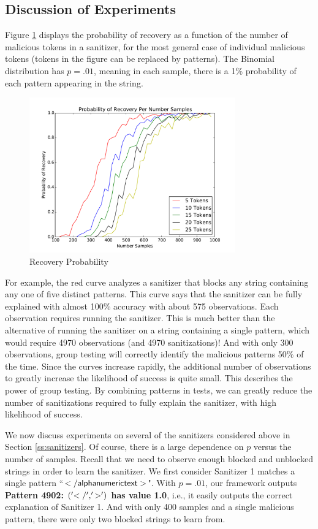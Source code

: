 \subsection{Discussion of Experiments}
Figure \ref{fig:recovery_probability} displays the probability of recovery as a function of the number of malicious tokens in a sanitizer, for the most general case of individual malicious tokens (tokens in the figure can be replaced by patterns). The Binomial distribution has $p=.01$, meaning in each sample, there is a 1\% probability of each pattern appearing in the string.
\begin{figure}[!thb]
	\centering
	\includegraphics[width=3.5in]{./recovery_probability_per_samples.pdf}
	\caption{Recovery Probability}
	\label{fig:recovery_probability}
\end{figure}
For example, the red curve analyzes a sanitizer that blocks any string containing any one of five distinct patterns. This curve says that the sanitizer can be fully explained with almost 100\% accuracy with about 575 observations. Each observation requires running the sanitizer. This is much better than the alternative of running the sanitizer on a string containing a single pattern, which would require 4970 observations (and 4970 sanitizations)! And with only 300 observations, group testing will correctly identify the malicious patterns 50\% of the time. Since the curves increase rapidly, the additional number of observations to greatly increase the likelihood of success is quite small. This describes the power of group testing. By combining patterns in tests, we can greatly reduce the number of sanitizations required to fully explain the sanitizer, with high likelihood of success.

We now discuss experiments on several of the sanitizers considered above in Section \ref{ss:sanitizers}. Of course, there is a large dependence on $p$ versus the number of samples. Recall that we need to observe enough blocked and unblocked strings in order to learn the sanitizer. We first consider Sanitizer 1 matches a single pattern ``$\sf{</alphanumerictext>}$". With $p=.01$, our framework outputs \textbf{Pattern 4902: $\sf{('</', '>')}$ has value 1.0}, i.e., it easily outputs the correct explanation of Sanitizer 1. And with only 400 samples and a single malicious pattern, there were only two blocked strings to learn from.

